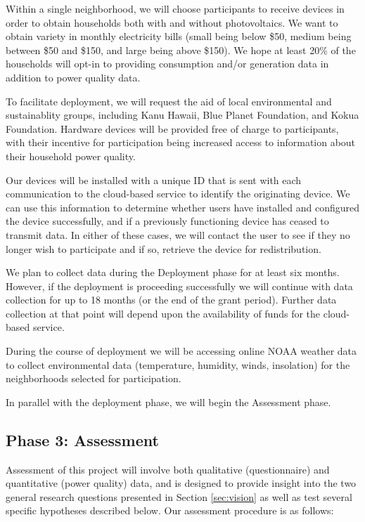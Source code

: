 Within a single neighborhood, we will choose participants to receive devices in order to obtain households both with and without photovoltaics. We want to obtain variety in monthly electricity bills (small being below \$50, medium being between \$50 and \$150, and large being above \$150).  We hope at least 20\% of the households will opt-in to providing consumption and/or generation data in addition to power quality data. 

To facilitate deployment, we will request the aid of local environmental and sustainablity groups, including Kanu Hawaii, Blue Planet Foundation, and Kokua Foundation.  Hardware devices will be provided free of charge to participants, with their incentive for participation being increased access to information about their household power quality.  

Our devices will be installed with a unique ID that is sent with each communication to the cloud-based service to identify the originating device.  We can use this information to determine whether users have installed and configured the device successfully, and if a previously functioning device has ceased to transmit data.   In either of these cases, we will contact the user to see if they no longer wish to participate and if so, retrieve the device for redistribution. 

We plan to collect data during the Deployment phase for at least six months. However, if the deployment is proceeding successfully we will continue with data collection for up to 18 months (or the end of the grant period).  Further data collection at that point will depend upon the availability of funds for the cloud-based service.

During the course of deployment we will be accessing online NOAA weather data to collect environmental data (temperature, humidity, winds, insolation) for the neighborhoods selected for participation. 

In parallel with the deployment phase, we will begin the Assessment phase. 

\subsection{Phase 3: Assessment}

Assessment of this project will involve both qualitative (questionnaire) and quantitative (power quality) data, and is designed to provide insight into the two general research questions presented in Section \ref{sec:vision} as well as test several specific hypotheses described below. Our assessment procedure is as follows:

